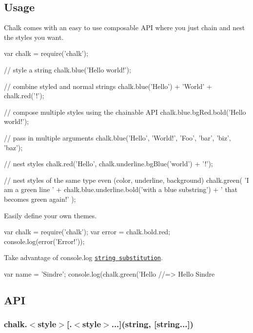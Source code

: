 

\subsection*{Usage}

Chalk comes with an easy to use composable A\+PI where you just chain and nest the styles you want.


\begin{DoxyCode}
var chalk = require('chalk');

// style a string
chalk.blue('Hello world!');

// combine styled and normal strings
chalk.blue('Hello') + 'World' + chalk.red('!');

// compose multiple styles using the chainable API
chalk.blue.bgRed.bold('Hello world!');

// pass in multiple arguments
chalk.blue('Hello', 'World!', 'Foo', 'bar', 'biz', 'baz');

// nest styles
chalk.red('Hello', chalk.underline.bgBlue('world') + '!');

// nest styles of the same type even (color, underline, background)
chalk.green(
    'I am a green line ' +
    chalk.blue.underline.bold('with a blue substring') +
    ' that becomes green again!'
);
\end{DoxyCode}


Easily define your own themes.


\begin{DoxyCode}
var chalk = require('chalk');
var error = chalk.bold.red;
console.log(error('Error!'));
\end{DoxyCode}


Take advantage of console.\+log \href{http://nodejs.org/docs/latest/api/console.html#console_console_log_data}{\tt string substitution}.


\begin{DoxyCode}
var name = 'Sindre';
console.log(chalk.green('Hello %
//=> Hello Sindre
\end{DoxyCode}


\subsection*{A\+PI}

\subsubsection*{chalk.{\ttfamily $<$style$>$\mbox{[}.$<$style$>$...\mbox{]}(string, \mbox{[}string...\mbox{]})}}

